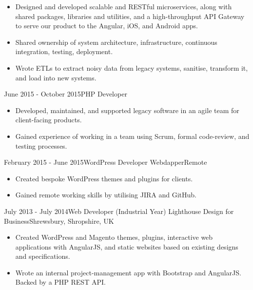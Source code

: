 \documentclass[11pt,a4paper]{moderncv}
\begin{document}
			{}{
				\vspace{.25em}
				\vspace{.1em}
				\begin{itemize}
					\item Designed and developed scalable and RESTful microservices, along with shared packages, libraries and utilities, and a high-throughput API Gateway to serve our product to the Angular, iOS, and Android apps.
					\item Shared ownership of system architecture, infrastructure, continuous integration, testing, deployment.
					\item Wrote ETLs to extract noisy data from legacy systems, sanitise, transform it, and load into new systems.
				\end{itemize}
			}
			\vspace{-1em}
		\cventry
			{June 2015 - October 2015}{PHP Developer}
			{}{}{}{
				\begin{itemize}
					\item Developed, maintained, and supported legacy software in an agile team for client-facing products.
					\item Gained experience of working in a team using Scrum, formal code-review, and testing processes.
				\end{itemize}
				\vspace{.25em}
			}
		\cventry
			{February 2015 - June 2015}{WordPress Developer}
			{Webdapper}{Remote}
			{}{
				\begin{itemize}
					\item Created bespoke WordPress themes and plugins for clients.
					\item Gained remote working skills by utilising JIRA and GitHub.
				\end{itemize}
				\vspace{.25em}
			}
		\cventry
			{July 2013 - July 2014}{Web Developer (Industrial Year)}
			{Lighthouse Design for Business}{Shrewsbury, Shropshire, UK}{}{
				\begin{itemize}
					\item Created WordPress and Magento themes, plugins, interactive web applications with AngularJS, and static websites based on existing designs and specifications.
					\item Wrote an internal project-management app with Bootstrap and AngularJS. Backed by a PHP REST API.
				\end{itemize}
			}
\end{document}
